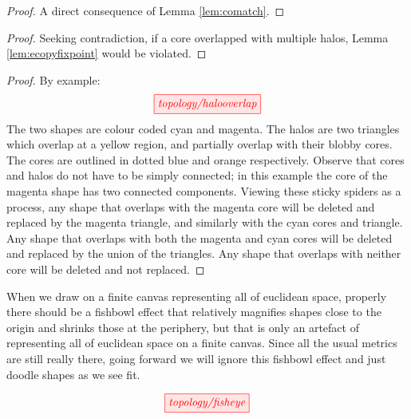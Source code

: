\begin{proposition}
\begin{proof}
A direct consequence of Lemma \ref{lem:comatch}.
\end{proof}
\end{proposition}

\begin{proposition}
\begin{proof}
Seeking contradiction, if a core overlapped with multiple halos, Lemma \ref{lem:ecopyfixpoint} would be violated.
\end{proof}
\end{proposition}

\begin{proposition}
\begin{proof}
By example:
\[\tikzfig{topology/halooverlap}\]
The two shapes are colour coded cyan and magenta. The halos are two triangles which overlap at a yellow region, and partially overlap with their blobby cores. The cores are outlined in dotted blue and orange respectively. Observe that cores and halos do not have to be simply connected; in this example the core of the magenta shape has two connected components. Viewing these sticky spiders as a process, any shape that overlaps with the magenta core will be deleted and replaced by the magenta triangle, and similarly with the cyan cores and triangle. Any shape that overlaps with both the magenta and cyan cores will be deleted and replaced by the union of the triangles. Any shape that overlaps with neither core will be deleted and not replaced.
\end{proof}
\end{proposition}

\begin{remark}
When we draw on a finite canvas representing all of euclidean space, properly there should be a fishbowl effect that relatively magnifies shapes close to the origin and shrinks those at the periphery, but that is only an artefact of representing all of euclidean space on a finite canvas. Since all the usual metrics are still really there, going forward we will ignore this fishbowl effect and just doodle shapes as we see fit.

\[\tikzfig{topology/fisheye}\]
\end{remark}

\newpage

